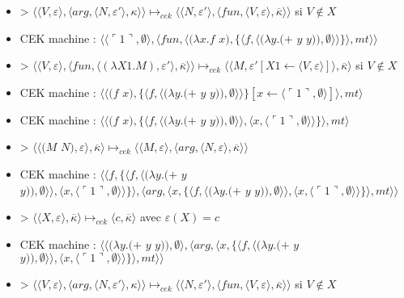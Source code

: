 \documentclass[10pt,a4paper]{article}
\begin{document}
\begin{itemize}
						\item[] >  $\langle \langle V,\varepsilon\rangle,\langle arg,\langle N,\varepsilon'\rangle,\kappa\rangle\rangle \longmapsto_{cek} \langle \langle N,\varepsilon'\rangle,\langle fun,\langle V,\varepsilon\rangle,\overline{\kappa}\rangle\rangle$ si $V \notin X$
						\item[] CEK machine : $\langle\langle\ulcorner 1\urcorner,\emptyset\rangle,\langle fun,\langle(\lambda x.f$ $x),\{\langle f,\langle(\lambda y.(+$ $y$ $y)),\emptyset\rangle\rangle\}\rangle,mt\rangle\rangle$
						\item[] > $\langle\langle V,\varepsilon\rangle,\langle fun,\langle (\lambda X1.M),\varepsilon'\rangle,\overline{\kappa} \rangle \rangle \longmapsto_{cek} \langle \langle M,\varepsilon'[X1 \leftarrow \langle V,\varepsilon\rangle]\rangle,\overline{\kappa}\rangle$ si $V \notin X$
						\item[] CEK machine : $\langle\langle(f$ $x),\{\langle f,\langle(\lambda y.(+$ $y$ $y)),\emptyset\rangle\rangle\}[x \leftarrow \langle\ulcorner 1\urcorner,\emptyset\rangle]\rangle,mt\rangle$
						\item[] CEK machine : $\langle\langle(f$ $x),\{\langle f,\langle(\lambda y.(+$ $y$ $y)),\emptyset\rangle\rangle,\langle x,\langle\ulcorner 1\urcorner,\emptyset\rangle\rangle\}\rangle,mt\rangle$
						\item[] > $\langle\langle(M$ $N),\varepsilon\rangle,\overline{\kappa}\rangle \longmapsto_{cek} \langle \langle M,\varepsilon\rangle,\langle arg,\langle N,\varepsilon\rangle,\overline{\kappa}\rangle\rangle$
						\item[] CEK machine : $\langle\langle f,\{\langle f,\langle(\lambda y.(+$ $y$ $y)),\emptyset\rangle\rangle,\langle x,\langle\ulcorner 1\urcorner,\emptyset\rangle\rangle\}\rangle,\langle arg,\langle x,\{\langle f,\langle(\lambda y.(+$ $y$ $y)),\emptyset\rangle\rangle,\langle x,\langle\ulcorner 1\urcorner,\emptyset\rangle\rangle\}\rangle,mt\rangle\rangle$
						\item[] > $\langle\langle X,\varepsilon\rangle,\overline{\kappa}\rangle \longmapsto_{cek} \langle c,\overline{\kappa}\rangle$ avec $\varepsilon(X) = c$
						\item[] CEK machine : $\langle\langle(\lambda y.(+$ $y$ $y)),\emptyset\rangle,\langle arg,\langle x,\{\langle f,\langle(\lambda y.(+$ $y$ $y)),\emptyset\rangle\rangle,\langle x,\langle\ulcorner 1\urcorner,\emptyset\rangle\rangle\}\rangle,mt\rangle\rangle$
						\item[] > $\langle \langle V,\varepsilon\rangle,\langle arg,\langle N,\varepsilon'\rangle,\kappa\rangle\rangle \longmapsto_{cek} \langle \langle N,\varepsilon'\rangle,\langle fun,\langle V,\varepsilon\rangle,\overline{\kappa}\rangle\rangle$ si $V \notin X$

\end{itemize}
\end{document}
